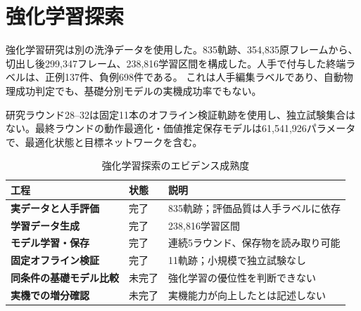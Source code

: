 \section{強化学習探索}

強化学習研究は別の洗浄データを使用した。835軌跡、354,835原フレームから、切出し後299,347フレーム、238,816学習区間を構成した。人手で付与した終端ラベルは、正例137件、負例698件である。 これは人手編集ラベルであり、自動物理成功判定でも、基礎分別モデルの実機成功率でもない。

研究ラウンド28--32は固定11本のオフライン検証軌跡を使用し、独立試験集合はない。最終ラウンドの動作最適化・価値推定保存モデルは61,541,926パラメータで、最適化状態と目標ネットワークを含む。

\begin{table}[H]
\centering
\caption{強化学習探索のエビデンス成熟度}
\begin{tabularx}{\textwidth}{>{\bfseries}p{31mm}p{24mm}X}
\toprule
工程 & 状態 & 説明\\
\midrule
実データと人手評価 & 完了 & 835軌跡；評価品質は人手ラベルに依存\\
学習データ生成 & 完了 & 238,816学習区間\\
モデル学習・保存 & 完了 & 連続5ラウンド、保存物を読み取り可能\\
固定オフライン検証 & 完了 & 11軌跡；小規模で独立試験なし\\
同条件の基礎モデル比較 & 未完了 & 強化学習の優位性を判断できない\\
実機での増分確認 & 未完了 & 実機能力が向上したとは記述しない\\
\bottomrule
\end{tabularx}
\end{table}
